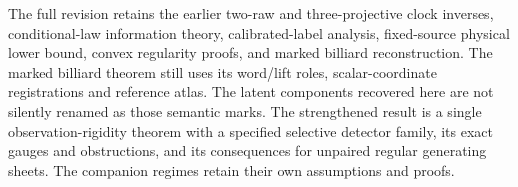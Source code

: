 The full revision retains the earlier two-raw and three-projective
clock inverses, conditional-law information theory, calibrated-label
analysis, fixed-source physical lower bound, convex regularity proofs,
and marked billiard reconstruction. The marked billiard theorem still
uses its word/lift roles, scalar-coordinate registrations and reference
atlas. The latent components recovered here are not silently renamed
as those semantic marks. The strengthened result is a single
observation-rigidity theorem with a specified selective detector family,
its exact gauges and obstructions, and its consequences for unpaired
regular generating sheets. The companion regimes retain their own
assumptions and proofs.
